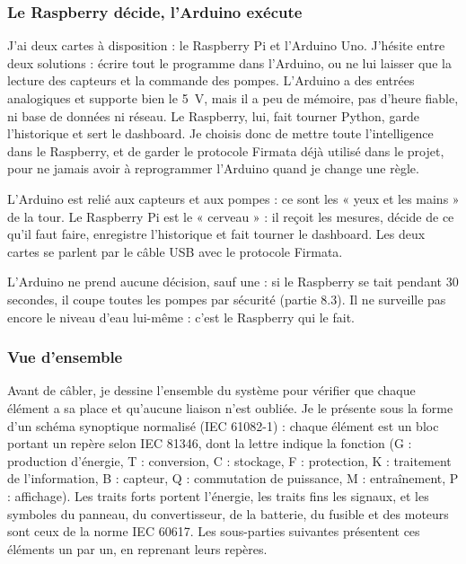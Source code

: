\subsubsection*{Le Raspberry décide, l'Arduino exécute}

J'ai deux cartes à disposition : le Raspberry Pi et l'Arduino Uno. J'hésite entre deux solutions : écrire tout le programme dans l'Arduino, ou ne lui laisser que la lecture des capteurs et la commande des pompes. L'Arduino a des entrées analogiques et supporte bien le \qty{5}{V}, mais il a peu de mémoire, pas d'heure fiable, ni base de données ni réseau. Le Raspberry, lui, fait tourner Python, garde l'historique et sert le dashboard. Je choisis donc de mettre toute l'intelligence dans le Raspberry, et de garder le protocole Firmata déjà utilisé dans le projet, pour ne jamais avoir à reprogrammer l'Arduino quand je change une règle.

L'Arduino est relié aux capteurs et aux pompes : ce sont les « yeux et les mains » de la tour. Le Raspberry Pi est le « cerveau » : il reçoit les mesures, décide de ce qu'il faut faire, enregistre l'historique et fait tourner le dashboard. Les deux cartes se parlent par le câble USB avec le protocole Firmata.

\begin{aretenir}
L'Arduino ne prend aucune décision, sauf une : si le Raspberry se tait pendant 30 secondes, il coupe toutes les pompes par sécurité (partie 8.3). Il ne surveille pas encore le niveau d'eau lui-même : c'est le Raspberry qui le fait.
\end{aretenir}

\subsubsection*{Vue d'ensemble}

Avant de câbler, je dessine l'ensemble du système pour vérifier que chaque élément a sa place et qu'aucune liaison n'est oubliée. Je le présente sous la forme d'un schéma synoptique normalisé (IEC 61082-1) : chaque élément est un bloc portant un repère selon IEC 81346, dont la lettre indique la fonction (G : production d'énergie, T : conversion, C : stockage, F : protection, K : traitement de l'information, B : capteur, Q : commutation de puissance, M : entraînement, P : affichage). Les traits forts portent l'énergie, les traits fins les signaux, et les symboles du panneau, du convertisseur, de la batterie, du fusible et des moteurs sont ceux de la norme IEC 60617. Les sous-parties suivantes présentent ces éléments un par un, en reprenant leurs repères.

